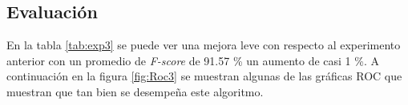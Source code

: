 \subsection{Evaluación}
\begin{center}
	
\end{center}

\par En la tabla \ref{tab:exp3} se puede ver una mejora leve con respecto al experimento anterior con un promedio de \textit{F-score} de 91.57 \% un aumento de casi 1 \%. A continuación en la figura \ref{fig:Roc3}  se muestran algunas de las gráficas ROC que muestran que tan bien se desempeña este algoritmo.

\begin{figure}

	\begin{table}[H]
		\centering
\end{table}
\end{figure}

